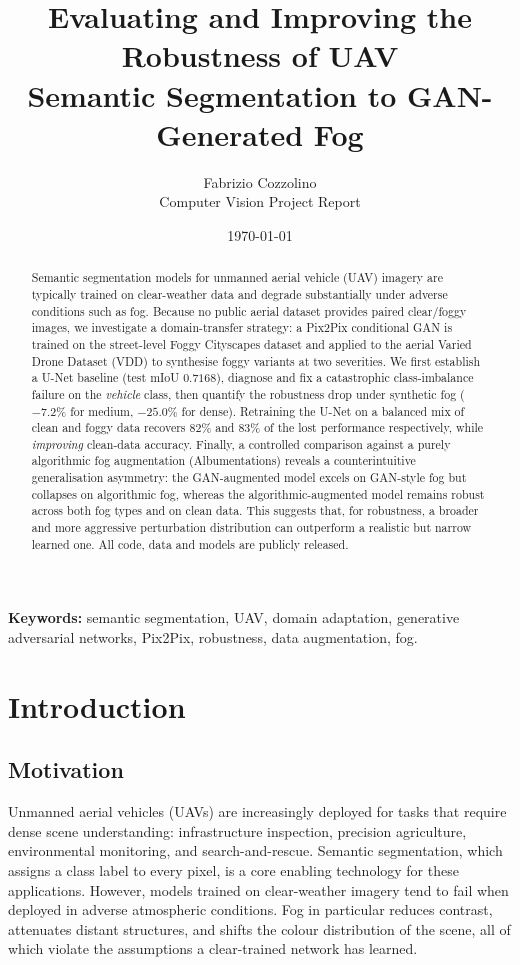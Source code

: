\documentclass[11pt,a4paper]{article}
\title{\textbf{Evaluating and Improving the Robustness of UAV\\
Semantic Segmentation to GAN-Generated Fog}}
\author{Fabrizio Cozzolino\\
\small Computer Vision Project Report}
\date{\today}
\begin{document}
\maketitle
\thispagestyle{empty}

\begin{abstract}
\noindent
Semantic segmentation models for unmanned aerial vehicle (UAV) imagery are
typically trained on clear-weather data and degrade substantially under adverse
conditions such as fog. Because no public aerial dataset provides paired
clear/foggy images, we investigate a domain-transfer strategy: a Pix2Pix
conditional GAN is trained on the street-level Foggy Cityscapes dataset and
applied to the aerial Varied Drone Dataset (VDD) to synthesise foggy variants
at two severities. We first establish a U-Net baseline (test mIoU $0.7168$),
diagnose and fix a catastrophic class-imbalance failure on the \emph{vehicle}
class, then quantify the robustness drop under synthetic fog ($-7.2\%$ for
medium, $-25.0\%$ for dense). Retraining the U-Net on a balanced mix of clean
and foggy data recovers $82\%$ and $83\%$ of the lost performance respectively,
while \emph{improving} clean-data accuracy. Finally, a controlled comparison
against a purely algorithmic fog augmentation (Albumentations) reveals a
counterintuitive generalisation asymmetry: the GAN-augmented model excels on
GAN-style fog but collapses on algorithmic fog, whereas the
algorithmic-augmented model remains robust across both fog types and on clean
data. This suggests that, for robustness, a broader and more aggressive
perturbation distribution can outperform a realistic but narrow learned one.
All code, data and models are publicly released.
\end{abstract}

\vspace{0.5cm}
\noindent\textbf{Keywords:} semantic segmentation, UAV, domain adaptation,
generative adversarial networks, Pix2Pix, robustness, data augmentation, fog.

\newpage
\tableofcontents
\newpage

\section{Introduction}

\subsection{Motivation}
Unmanned aerial vehicles (UAVs) are increasingly deployed for tasks that
require dense scene understanding: infrastructure inspection, precision
agriculture, environmental monitoring, and search-and-rescue. Semantic
segmentation, which assigns a class label to every pixel, is a core enabling
technology for these applications. However, models trained on clear-weather
imagery tend to fail when deployed in adverse atmospheric conditions. Fog in
particular reduces contrast, attenuates distant structures, and shifts the
colour distribution of the scene, all of which violate the assumptions a
clear-trained network has learned.
\end{document}
